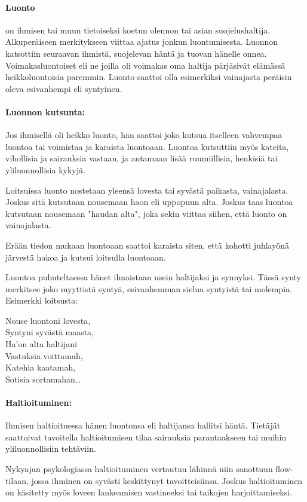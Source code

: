   \paragraph{Luonto} on ihmisen tai muun tietoiseksi koetun olennon tai asian suojelushaltija. 
    Alkuperäiseen merkitykseen viittaa ajatus jonkun luontumisesta. Luonnon katsottiin 
    seuraavan ihmistä, suojelevan häntä ja tuovan hänelle onnea. Voimakasluontoiset eli ne 
    joilla oli voimakas oma haltija pärjäsivät elämässä heikkoluontoisia paremmin. Luonto 
    saattoi olla esimerkiksi vainajasta peräisin oleva esivanhempi eli syntyinen.
  \paragraph{Luonnon kutsunta:} Jos ihmisellä oli heikko luonto, hän saattoi joko kutsua itselleen 
    vahvempaa luontoa tai voimistaa ja karaista luontoaan. Luontoa kutsuttiin myös kateita, 
    vihollisia ja sairauksia vastaan, ja antamaan lisää ruumiillisia, henkisiä tai 
    yliluonnollisia kykyjä. \par Loitsuissa luonto nostetaan yleensä lovesta tai syvästä paikasta, 
    vainajalasta. Joskus sitä kutsutaan nousemaan haon eli uppopuun alta. Joskus taas luontoa 
    kutsutaan nousemaan "haudan alta", joka sekin viittaa siihen, että luonto on vainajalasta. \par
    Erään tiedon mukaan luontoaan saattoi karaista siten, että kohotti juhlayönä järvestä 
    hakoa ja kutsui loitsulla luontoaan. \par Luontoa puhuteltaessa hänet ilmaistaan usein 
    haltijaksi ja synnyksi. Tässä synty merkitsee joko myyttistä syntyä, esivanhemman sielua 
    syntyistä tai molempia. Esimerkki loitsusta:

    \begin{center}\begin{em}
      Nouse luontoni lovesta,\\
      Syntyni syvästä maasta,\\
      Ha'on alta haltijani\\
      Vastuksia voittamah,\\
      Katehia kaatamah,\\
      Sotisia sortamahan\ldots\\
    \end{em}\end{center}

  \paragraph{Haltioituminen:} Ihmisen haltioituessa hänen luontonsa eli haltijansa hallitsi häntä. 
    Tietäjät saattoivat tavoitella haltioitumisen tilaa sairauksia parantaakseen tai muihin 
    yliluonnollisiin tehtäviin. \par Nykyajan psykologiassa haltioituminen vertautuu lähinnä niin 
    sanottuun flow-tilaan, jossa ihminen on syvästi keskittynyt tavoitteisiinsa. Joskus 
    haltioituminen on käsitetty myös loveen lankeamisen vastineeksi tai taikojen 
    harjoittamiseksi. 
